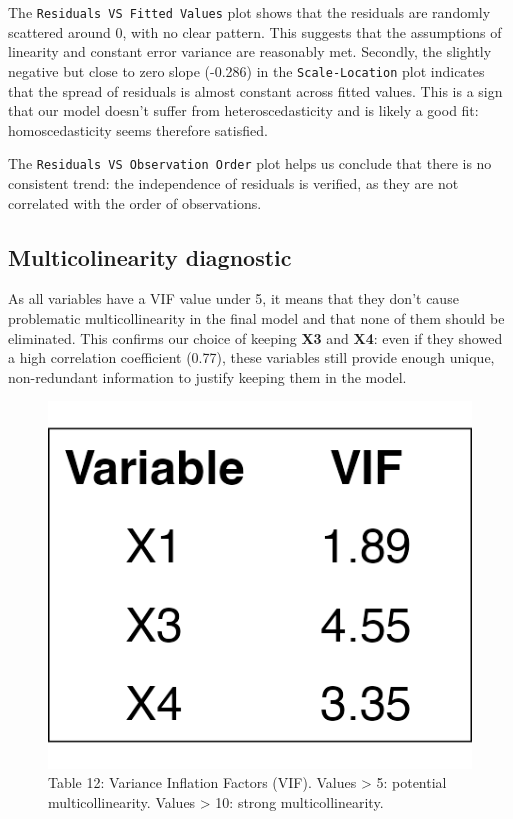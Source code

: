 \documentclass[
  12pt,
]{article}
\begin{document}
The \texttt{Residuals\ VS\ Fitted\ Values} plot shows that the residuals
are randomly scattered around 0, with no clear pattern. This suggests
that the assumptions of linearity and constant error variance are
reasonably met. Secondly, the slightly negative but close to zero slope
(-0.286) in the \texttt{Scale-Location} plot indicates that the spread
of residuals is almost constant across fitted values. This is a sign
that our model doesn't suffer from heteroscedasticity and is likely a
good fit: homoscedasticity seems therefore satisfied.

The \texttt{Residuals\ VS\ Observation\ Order} plot helps us conclude
that there is no consistent trend: the independence of residuals is
verified, as they are not correlated with the order of observations.

\vspace{-0.5em}

\subsection{Multicolinearity
diagnostic}\label{multicolinearity-diagnostic}

\noindent

\begin{minipage}{0.6\textwidth}
\vspace{-0.5em}
As all variables have a VIF value under 5, it means that they don’t cause problematic multicollinearity in the final model and that none of them should be eliminated. This confirms our choice of keeping \textbf{X3} and \textbf{X4}: even if they showed a high correlation coefficient (0.77), these variables still provide enough unique, non-redundant information to justify keeping them in the model.
\end{minipage}
\hfill
\begin{minipage}{0.37\textwidth}
\vspace{-3em}
  \begin{figure}[H]
    \centering
    \includegraphics[width=0.8\linewidth]{figures/vif_table.png}
    \vspace{-0.5em}
    \captionsetup{font=normalsize}
    \caption*{Table 12: Variance Inflation Factors (VIF). Values > 5: potential multicollinearity. Values > 10: strong multicollinearity.}
  \end{figure}
\end{minipage}
\end{document}
